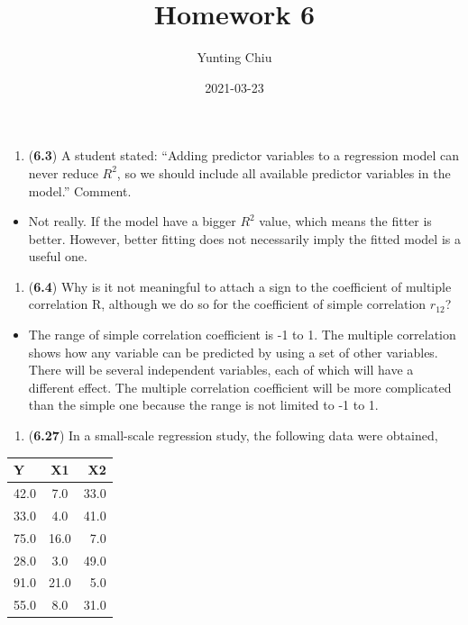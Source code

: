 \documentclass[
]{article}
\title{Homework 6}
\author{Yunting Chiu}
\date{2021-03-23}
\providecommand{\tightlist}{%
  \setlength{\itemsep}{0pt}\setlength{\parskip}{0pt}}
\begin{document}
\maketitle

\begin{enumerate}
\def\labelenumi{\arabic{enumi}.}
\tightlist
\item
  (\textbf{6.3}) A student stated: ``Adding predictor variables to a
  regression model can never reduce \(R^2\), so we should include all
  available predictor variables in the model.'' Comment.
\end{enumerate}

\begin{itemize}
\tightlist
\item
  Not really. If the model have a bigger \(R^2\) value, which means the
  fitter is better. However, better fitting does not necessarily imply
  the fitted model is a useful one.
\end{itemize}

\begin{enumerate}
\def\labelenumi{\arabic{enumi}.}
\setcounter{enumi}{1}
\tightlist
\item
  (\textbf{6.4}) Why is it not meaningful to attach a sign to the
  coefficient of multiple correlation R, although we do so for the
  coefficient of simple correlation \(r_{12}\)?
\end{enumerate}

\begin{itemize}
\tightlist
\item
  The range of simple correlation coefficient is -1 to 1. The multiple
  correlation shows how any variable can be predicted by using a set of
  other variables. There will be several independent variables, each of
  which will have a different effect. The multiple correlation
  coefficient will be more complicated than the simple one because the
  range is not limited to -1 to 1.
\end{itemize}

\begin{enumerate}
\def\labelenumi{\arabic{enumi}.}
\setcounter{enumi}{2}
\tightlist
\item
  (\textbf{6.27}) In a small-scale regression study, the following data
  were obtained,
\end{enumerate}

\begin{longtable}[]{@{}lcr@{}}
\toprule
Y & X1 & X2\tabularnewline
\midrule
\endhead
42.0 & 7.0 & 33.0\tabularnewline
33.0 & 4.0 & 41.0\tabularnewline
75.0 & 16.0 & 7.0\tabularnewline
28.0 & 3.0 & 49.0\tabularnewline
91.0 & 21.0 & 5.0\tabularnewline
55.0 & 8.0 & 31.0\tabularnewline
\bottomrule
\end{longtable}
\end{document}
